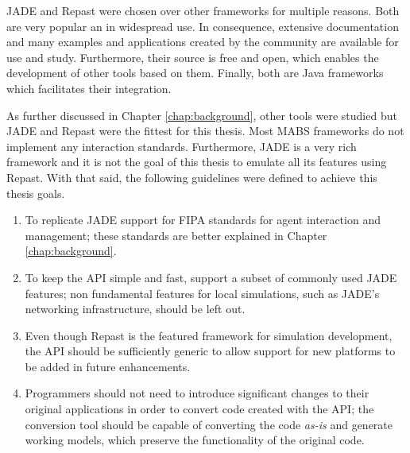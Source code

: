 JADE and Repast were chosen over other frameworks for multiple reasons. Both are very popular an in widespread use. In consequence, extensive documentation and many examples and applications created by the community are available for use and study. Furthermore, their source is free and open, which enables the development of other tools based on them. Finally, both are Java frameworks which facilitates their integration.

As further discussed in Chapter \ref{chap:background}, other tools were studied but JADE and Repast were the fittest for this thesis. Most MABS frameworks do not implement any interaction standards. Furthermore, JADE is a very rich framework and it is not the goal of this thesis to emulate all its features using Repast. With that said, the following guidelines were defined to achieve this thesis goals.

\begin{enumerate}
	\item To replicate JADE support for FIPA standards for agent interaction and management; these standards are better explained in Chapter \ref{chap:background}.
	\item To keep the API simple and fast, support a subset of commonly used JADE features; non fundamental features for local simulations, such as JADE's networking infrastructure, should be left out.
	\item Even though Repast is the featured framework for simulation development, the API should be sufficiently generic to allow support for new platforms to be added in future enhancements.
	\item Programmers should not need to introduce significant changes to their original applications in order to convert code created with the API; the conversion tool should be capable of converting the code \emph{as-is} and generate working models, which preserve the functionality of the original code.
\end{enumerate}



